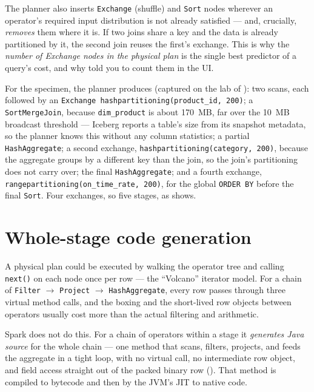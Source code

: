The planner also inserts \texttt{Exchange} (shuffle) and \texttt{Sort} nodes
wherever an operator's required input distribution is not already satisfied ---
and, crucially, \emph{removes} them where it is. If two joins share a key and the
data is already partitioned by it, the second join reuses the first's exchange.
This is why the \emph{number of Exchange nodes in the physical plan} is the
single best predictor of a query's cost, and why  told you to
count them in the UI.

For the specimen, the planner produces (captured on the lab of
): two scans, each followed by an \texttt{Exchange
hashpartitioning(product\_id, 200)}; a \texttt{SortMergeJoin}, because
\texttt{dim\_product} is about 170~MB, far over the 10~MB broadcast threshold
--- Iceberg reports a table's size from its snapshot metadata, so the planner
knows this without any column statistics; a partial \texttt{HashAggregate}; a
second exchange, \texttt{hashpartitioning(category, 200)}, because the aggregate
groups by a different key than the join, so the join's partitioning does not
carry over; the final \texttt{HashAggregate}; and a fourth exchange,
\texttt{rangepartitioning(on\_time\_rate, 200)}, for the global \texttt{ORDER BY}
before the final \texttt{Sort}. Four exchanges, so five stages, as
 shows.

\section{Whole-stage code generation}
\label{sec:wholestage-codegen}

A physical plan could be executed by walking the operator tree and calling
\texttt{next()} on each node once per row --- the ``Volcano'' iterator model. For
a chain of \texttt{Filter} $\to$ \texttt{Project} $\to$ \texttt{HashAggregate},
every row passes through three virtual method calls, and the boxing and the
short-lived row objects between operators usually cost more than the actual
filtering and arithmetic.

Spark does not do this. For a chain of operators within a stage it \emph{generates
Java source} for the whole chain --- one method that scans, filters, projects,
and feeds the aggregate in a tight loop, with no virtual call, no intermediate
row object, and field access straight out of the packed binary row
(). That method is compiled to bytecode and then by the JVM's
JIT to native code.

